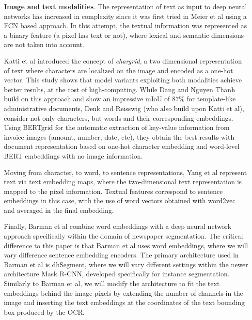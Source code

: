 \documentclass[english, bibtex]{kththesis}
\begin{document}
\textbf{Image and text modalities}. The representation of text as input to deep neural networks has increased in complexity since it was first tried in Meier et al\cite{8270006} using a FCN based approach. In this attempt, the textual information was represented as a binary feature (a pixel has text or not), where lexical and semantic dimensions are not taken into account. 

Katti et al\cite{katti2018} introduced the concept of \textit{chargrid}, a two dimensional representation of text where characters are localized on the image and encoded as a one-hot vector. This study shows that model variants exploiting both modalities achieve better results, at the cost of high-computing. While Dang and Nguyen Thanh\cite{DBLP:journals/corr/abs-2106-00952} build on this approach and show an impressive mIoU of 87\% for template-like administrative documents, Denk and Reisswig\cite{DBLP:journals/corr/abs-1909-04948} (who also build upon Katti et al\cite{katti2018}), consider not only characters, but words and their corresponding embeddings. Using BERTgrid for the automatic extraction of key-value information from invoice images (amount, number, date, etc), they obtain the best results with document representation based on one-hot character embedding and word-level BERT embeddings with no image information.

Moving from character, to word, to sentence representations, Yang et al\cite{DBLP:journals/corr/YangYAKKG17} represent text via text embedding maps, where the two-dimensional text representation is mapped to the pixel information. Textual features correspond to sentence embeddings in this case, with the use of word vectors obtained with word2vec\cite{mikolov2013} and averaged in the final embedding. 

Finally, Barman et al\cite{jdmdh:7097} combine word embeddings with a deep neural network approach specifically within the domain of newspaper segmentation. The critical difference to this paper is that Barman et al\cite{jdmdh:7097} uses word embeddings, where we will vary difference sentence embedding encoders. The primary architecture used in Barman et al\cite{jdmdh:7097} is dhSegment, where we will vary different settings within the newer architecture Mask R-CNN, developed specifically for instance segmentation. Similarly to Barman et al\cite{jdmdh:7097}, we will modify the architecture to fit the text embeddings behind the image pixels by extending the number of channels in the image and inserting the text embeddings at the coordinates of the text bounding box produced by the OCR. 
\end{document}

